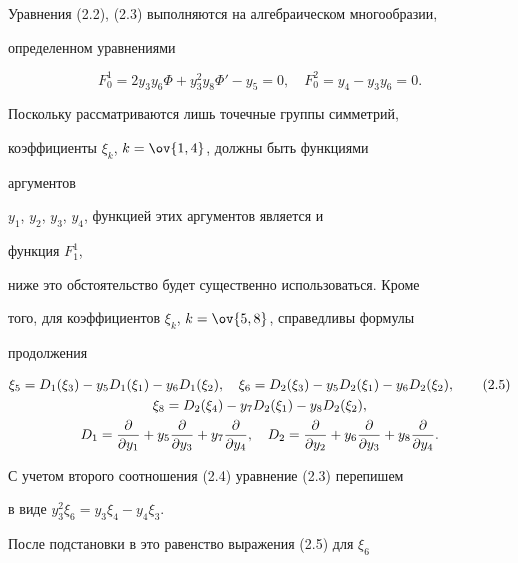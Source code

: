 Уравнения (2.2), (2.3) выполняются на алгебраическом многообразии, 


определенном уравнениями 


\begin{equation} 


F^1_0=2y_3y_6\Phi+y^2_3y_8\Phi'-y_5=0,\quad 


F^2_0=y_4-y_3y_6=0.\tag{2.4} 


\end{equation} 


Поскольку рассматриваются лишь точечные группы симметрий, 


коэффициенты $\xi_k$, $k=\ov{1,4}$, должны быть функциями


аргументов 


$y_1$, $y_2$, $y_3$, $y_4$, функцией этих аргументов является и 


функция $F^1_1$, 


ниже это обстоятельство будет существенно использоваться. Кроме 


того, для коэффициентов $\xi_k$, $k=\ov{5,8}$, справедливы формулы 


продолжения 


\begin{gather} 


\xi_5=D_1(\xi_3)-y_5D_1(\xi_1)-y_6D_1(\xi_2),\quad 


\xi_6=D_2(\xi_3)-y_5D_2(\xi_1)-y_6D_2(\xi_2),\tag{2.5}\\ 


% 


\xi_8=D_2(\xi_4)-y_7D_2(\xi_1)-y_8D_2(\xi_2),\notag\\ 


% 


D_1=\frac{\partial}{\partial y_1}+ 


y_5\frac{\partial}{\partial y_3}+ 


y_7\frac{\partial}{\partial y_4},\quad 


D_2=\frac{\partial}{\partial y_2}+ 


y_6\frac{\partial}{\partial y_3}+ 


y_8\frac{\partial}{\partial y_4}.\notag 


\end{gather} 


С учетом второго соотношения (2.4) уравнение (2.3) перепишем 


в виде $y^2_3\xi_6=y_3\xi_4-y_4\xi_3$. 


После подстановки в это равенство выражения (2.5) для $\xi_6$ 


